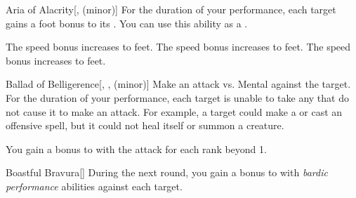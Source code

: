         {
            \begin{freeability}{Aria of Alacrity}[,  (minor)]
                For the duration of your performance, each target gains a  foot bonus to its .
                You can use this ability as a .

                \rankline
                 The speed bonus increases to  feet.
                 The speed bonus increases to  feet.
                 The speed bonus increases to  feet.
            \end{freeability}

            \begin{freeability}{Ballad of Belligerence}[, ,  (minor)]
                Make an attack vs. Mental against the target.
                \hit For the duration of your performance, each target is unable to take any  that do not cause it to make an attack.
                For example, a target could make a  or cast an offensive spell, but it could not heal itself or summon a creature.

                \rankline
                You gain a  bonus to  with the attack for each rank beyond 1.
            \end{freeability}

            \begin{freeability}{Boastful Bravura}[]
                During the next round, you gain a  bonus to  with \textit{bardic performance} abilities against each target.


\end{freeability}}
